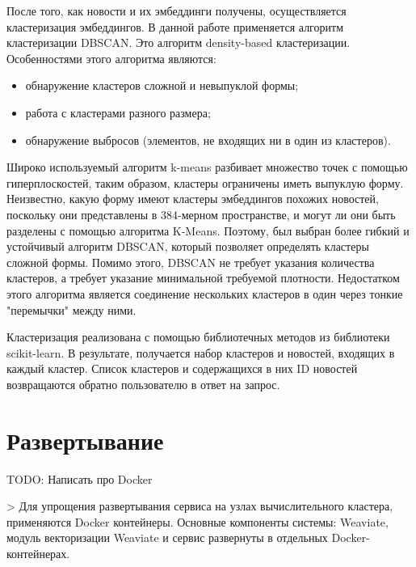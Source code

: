 После того, как новости и их эмбеддинги получены, осуществляется кластеризация эмбеддингов. В данной работе применяется алгоритм кластеризации DBSCAN. Это алгоритм density-based кластеризации. Особенностями этого алгоритма являются:
\begin{itemize}
    \item обнаружение кластеров сложной и невыпуклой формы;
    \item работа с кластерами разного размера;
    \item обнаружение выбросов (элементов, не входящих ни в один из кластеров).
\end{itemize}

Широко используемый алгоритм k-means разбивает множество точек с помощью гиперплоскостей, таким образом, кластеры ограничены иметь выпуклую форму. Неизвестно, какую форму имеют кластеры эмбеддингов похожих новостей, поскольку они представлены в 384-мерном пространстве, и могут ли они быть разделены с помощью алгоритма K-Means. Поэтому, был выбран более гибкий и устойчивый алгоритм DBSCAN, который позволяет определять кластеры сложной формы. Помимо этого, DBSCAN не требует указания количества кластеров, а требует указание минимальной требуемой плотности. Недостатком этого алгоритма является соединение нескольких кластеров в один через тонкие "перемычки" между ними.

Кластеризация реализована с помощью библиотечных методов из библиотеки scikit-learn. В результате, получается набор кластеров и новостей, входящих в каждый кластер. Список кластеров и содержащихся в них ID новостей возвращаются обратно пользователю в ответ на запрос.

\section{Развертывание}

TODO: Написать про Docker


> Для упрощения развертывания сервиса на узлах вычислительного кластера, применяются Docker контейнеры. Основные компоненты системы: Weaviate, модуль векторизации Weaviate и сервис развернуты в отдельных Docker-контейнерах.
